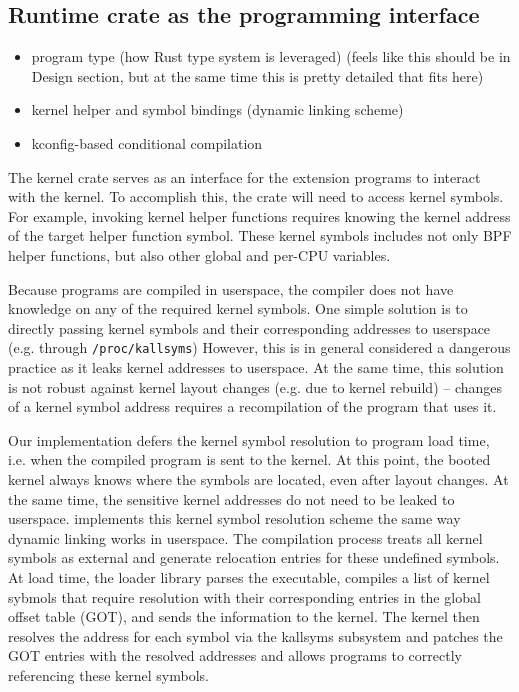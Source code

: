 \subsection{Runtime crate as the programming interface}
\begin{itemize}
    \item program type (how Rust type system is leveraged) (feels like this
        should be in Design section, but at the same time this is pretty
        detailed that fits here)
    \item kernel helper and symbol bindings (dynamic linking scheme)
    \item kconfig-based conditional compilation
\end{itemize}

The \projname{} kernel crate serves as an interface for the extension programs
    to interact with the kernel.
To accomplish this, the crate will need to access kernel symbols.
For example, invoking kernel helper functions requires knowing the kernel
    address of the target helper function symbol.
These kernel symbols includes not only BPF helper functions, but also other
    global and per-CPU variables.

Because \projname{} programs are compiled in userspace, the compiler does not
    have knowledge on any of the required kernel symbols.
One simple solution is to directly passing kernel symbols and their
    corresponding addresses to userspace (e.g. through \texttt{/proc/kallsyms})
However, this is in general considered a dangerous practice as it leaks kernel
    addresses to userspace.
At the same time, this solution is not robust against kernel layout changes
    (e.g. due to kernel rebuild) -- changes of a kernel symbol address requires
    a recompilation of the \projname{} program that uses it.

Our implementation defers the kernel symbol resolution to program load time,
    i.e. when the compiled \projname{} program is sent to the kernel.
At this point, the booted kernel always knows where the symbols are located,
    even after layout changes.
At the same time, the sensitive kernel addresses do not need to be leaked to
    userspace.
\projname{} implements this kernel symbol resolution scheme the same way
    dynamic linking works in userspace.
The compilation process treats all kernel symbols as external and generate
    relocation entries for these undefined symbols.
At load time, the loader library parses the executable, compiles a list of
    kernel sybmols that require resolution with their corresponding entries in
    the global offset table (GOT), and sends the information to the kernel.
The kernel then resolves the address for each symbol via the kallsyms subsystem
    and patches the GOT entries with the resolved addresses and allows programs
    to correctly referencing these kernel symbols.

